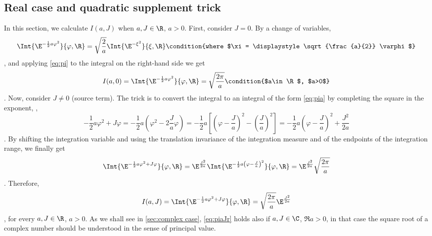 \subsection{Real case and quadratic supplement trick}
\label{sec:real case}

In this section, we calculate $I(a,J)$ when $a,J\in\R$, $a>0$. First, 
consider
$J=0$. By a change of variables,
\begin{dmath*}[compact]
   \Int{\E^{-\frac{1}{2} a\varphi^{2}}}{\varphi, \R} = 
   \sqrt{\frac{2}{a}} 
   \Int{\E^{-\xi ^{2}} }{\xi, \R}
   \condition{where $\xi = \displaystyle \sqrt{\frac{a}{2}} \varphi $}
\end{dmath*},
and applying \cref{eq:pi} to the integral on the right-hand side we get 
\begin{dmath}[label={pia},compact]
   I(a,0) =  \Int{\E^{-\frac{1}{2} a\varphi^{2}}}{\varphi, \R} = 
   \sqrt{\frac{2\pi}{a}} 
   \condition{$a\in\R$, $a>0$}
\end{dmath}.
Now, consider $J\neq 0$ (source term).
The trick is to convert the integral to an integral of the form \cref{eq:pia} by 
completing the square in the exponent, \ie,
\begin{dmath*}[compact]
   -\frac{1}{2}a\varphi^{2} + J\varphi =  - \frac{1}{2} a \left( \varphi^{2} - 2 \frac{J}{a} \varphi \right)
=
-\frac{1}{2}a \left[ \left( \varphi - \frac{J}{a}\right)^{2} -
\left(\frac{J}{a}\right)^{2}\right] 
= -\frac{1}{2} a \left( \varphi - \frac{J}{a} \right)^{2} + \frac{J^{2}}{2a} 
\end{dmath*}.
By shifting the integration variable and using the translation invariance
of the integration measure and of the endpoints of the integration range, we
finally get
\begin{dmath*}[compact]
   \Int{\E^{-\frac{1}{2}a\varphi^{2} + J\varphi }}{\varphi, \R} =
   \E^{\frac{J^{2}}{2a}} \Int{\E^{-\frac{1}{2}a \left( \varphi -
	    \frac{J}{a}\right)^{2}}} {\varphi, \R}
   = \E^{ \frac{J^{2}}{2a}} \sqrt{\frac{2\pi}{a}} 
\end{dmath*}.
Therefore, 
\begin{dmath}[label={piaJr}, compact]
   I(a,J) = \Int{\E^{-\frac{1}{2}a\varphi^{2}+J\varphi }}{\varphi,\R} =
   \sqrt{\frac{2\pi}{a}}
   \E^{\frac{J^{2}}{2a}} 
\end{dmath},
for every $a,J\in\R$, $a>0$.
As we shall see in \cref{sec:complex case}, \cref{eq:piaJr} holds
also if
$a,J\in\C$, $\Re a>0$, in that case
the square root of a complex number should be
   understood in the sense of principal value. 

